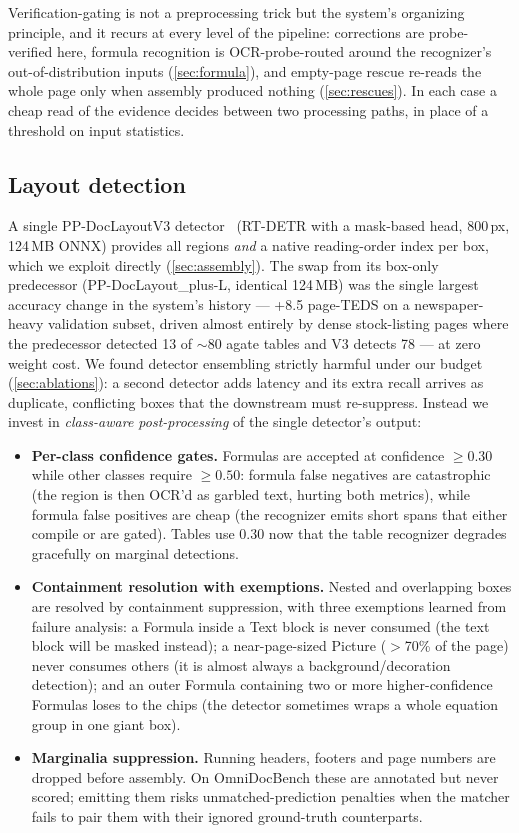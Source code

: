 Verification-gating is not a preprocessing trick but the system's organizing principle, and it recurs at every level of the pipeline: corrections are probe-verified here, formula recognition is OCR-probe-routed around the recognizer's out-of-distribution inputs (\cref{sec:formula}), and empty-page rescue re-reads the whole page only when assembly produced nothing (\cref{sec:rescues}). In each case a cheap read of the evidence decides between two processing paths, in place of a threshold on input statistics.

\subsection{Layout detection}
\label{sec:layout}

A single PP-DocLayoutV3 detector~\cite{paddleocrvl} (RT-DETR with a mask-based head, 800\,px, 124\,MB ONNX) provides all regions \emph{and} a native reading-order index per box, which we exploit directly (\cref{sec:assembly}). The swap from its box-only predecessor (PP-DocLayout\_plus-L, identical 124\,MB) was the single largest accuracy change in the system's history --- +8.5 page-TEDS on a newspaper-heavy validation subset, driven almost entirely by dense stock-listing pages where the predecessor detected 13 of $\sim$80 agate tables and V3 detects 78 --- at zero weight cost. We found detector ensembling strictly harmful under our budget (\cref{sec:ablations}): a second detector adds latency and its extra recall arrives as duplicate, conflicting boxes that the downstream must re-suppress. Instead we invest in \emph{class-aware post-processing} of the single detector's output:

\begin{itemize}
\item \textbf{Per-class confidence gates.} Formulas are accepted at confidence $\geq 0.30$ while other classes require $\geq 0.50$: formula false negatives are catastrophic (the region is then OCR'd as garbled text, hurting both metrics), while formula false positives are cheap (the recognizer emits short spans that either compile or are gated). Tables use $0.30$ now that the table recognizer degrades gracefully on marginal detections.
\item \textbf{Containment resolution with exemptions.} Nested and overlapping boxes are resolved by containment suppression, with three exemptions learned from failure analysis: a Formula inside a Text block is never consumed (the text block will be masked instead); a near-page-sized Picture ($>$70\% of the page) never consumes others (it is almost always a background/decoration detection); and an outer Formula containing two or more higher-confidence Formulas loses to the chips (the detector sometimes wraps a whole equation group in one giant box).
\item \textbf{Marginalia suppression.} Running headers, footers and page numbers are dropped before assembly. On OmniDocBench these are annotated but never scored; emitting them risks unmatched-prediction penalties when the matcher fails to pair them with their ignored ground-truth counterparts.
\end{itemize}


